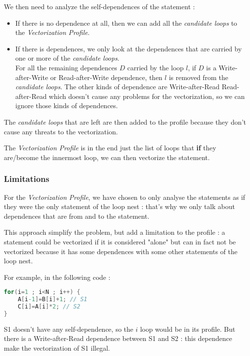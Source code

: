 \documentclass[paper=a4, fontsize=11.5pt]{scrartcl}
\numberwithin{equation}{section}        %
\numberwithin{figure}{section}          %
\numberwithin{table}{section}               %
\begin{document}
        \bigskip

        We then need to analyze the \glspl{self-dependence} of the statement :
        \begin{itemize}
            \item If there is no dependence at all, then we can add all the 
                \textit{candidate loops} to the \textit{Vectorization Profile}.
            \item If there is dependences, we only look at the dependences that
                are carried by one or more of the \textit{candidate loops}.\\
                For all the remaining dependences $D$ carried by the loop $l$,
                if $D$ is a Write-after-Write or Read-after-Write dependence, then $l$
                is removed from the \textit{candidate loops}.
                The other kinds of dependence are Write-after-Read Read-after-Read 
                which doesn't cause any problems for the vectorization, so we can ignore
                those kinds of dependences.
        \end{itemize}
        The \textit{candidate loops} that are left are then added to the profile because they
        don't cause any threats to the vectorization.

        \bigskip

        The \textit{Vectorization Profile} is in the end just the list of loops that
        \textbf{if} they are/become the innermost loop, we can then vectorize the statement.

        \subsubsection{Limitations}
        For the \textit{Vectorization Profile}, we have chosen to only analyse the statements
        as if they were the only statement of the loop nest : that's why we only talk
        about dependences that are from and to the statement.

        This approach simplify the problem, but add a limitation to the profile :
        a statement could be vectorized if it is considered "alone" but can in fact not
        be vectorized because it has some dependences with some other statements of the loop
        nest.

        For example, in the following code :
\begin{lstlisting}[frame=single, language=C, caption={Vectorization Profile limitation example}, label={lst:vectorization_limitation}]
for(i=1 ; i<N ; i++) {
    A[i-1]=B[i]+1; // S1
    C[i]=A[i]*2; // S2
}
\end{lstlisting}
    S1 doesn't have any \gls{self-dependence}, so the $i$ loop would be in its
    profile. But there is a Write-after-Read dependence between S1 and S2 : this dependence
    make the vectorization of S1 illegal.
\end{document}
